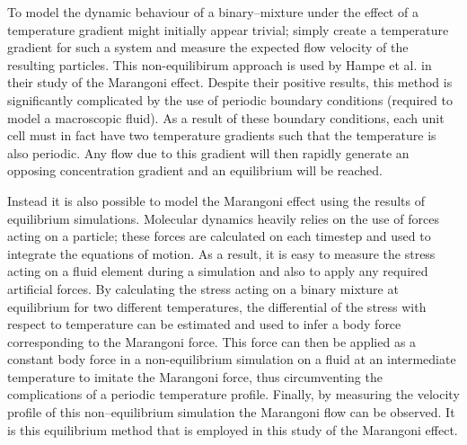 To model the dynamic behaviour of a binary--mixture under the effect of a temperature gradient might initially appear trivial; simply create a temperature gradient for such a system and measure the expected flow velocity of the resulting particles.
This non-equilibirum approach is used by Hampe et al. in their study of the Marangoni effect.\cite{HolgerBoppHampe}
Despite their positive results, this method is significantly complicated by the use of periodic boundary conditions (required to model a macroscopic fluid).
As a result of these boundary conditions, each unit cell must in fact have two temperature gradients such that the temperature is also periodic.
Any flow due to this gradient will then rapidly generate an opposing concentration gradient and an equilibrium will be reached.

Instead it is also possible to model the Marangoni effect using the results of equilibrium simulations. 
Molecular dynamics heavily relies on the use of forces acting on a particle; these forces are calculated on each timestep and used to integrate the equations of motion.
As a result, it is easy to measure the stress acting on a fluid element during a simulation and also to apply any required artificial forces.
By calculating the stress acting on a binary mixture at equilibrium for two different temperatures, the differential of the stress with respect to temperature can be estimated and used to infer a body force corresponding to the Marangoni force.
This force can then be applied as a constant body force in a non-equilibrium simulation on a fluid at an intermediate temperature to imitate the Marangoni force, thus circumventing the complications of a periodic temperature profile.
Finally, by measuring the velocity profile of this non--equilibrium simulation the Marangoni flow can be observed.
It is this equilibrium method that is employed in this study of the Marangoni effect.
